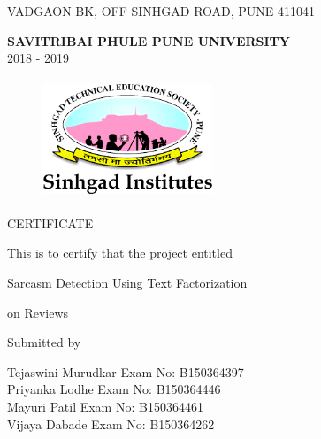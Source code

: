 \documentclass[oneside,a4paper,12pt]{book}
\begin{document}
\begin{center}
\fontsize{12}{12pt}\selectfont
VADGAON BK, OFF SINHGAD ROAD, PUNE 411041 \\[5mm]
\begin{center}
    \fontsize{12}{12pt}\selectfont
\textbf{SAVITRIBAI PHULE PUNE UNIVERSITY}\\ 2018 - 2019\\ 
\end{center}

\end{center}

\newpage
\setcounter{page}{0}
\frontmatter
{}
\rfoot{\thepage}

\begin{figure}[ht]
\centering
\includegraphics[height=1.4in, width=2.0in,keepaspectratio]{logo.png}\\[8mm]
\end{figure}


{\bfseries \fontsize{16}{12} \selectfont \centerline{CERTIFICATE} 
\vspace*{2\baselineskip}} 

\centerline{This is to certify that the project entitled}
\vspace*{.5\baselineskip} 


{\bfseries \fontsize{14}{12} \selectfont \centerline{Sarcasm Detection Using Text Factorization}
\centerline{on Reviews}  
\vspace*{0.5\baselineskip}}

\centerline{Submitted by}
\vspace*{0.5\baselineskip} 

\begin{flushleft}
\hspace{25 mm}Tejaswini Murudkar \hspace{25 mm} Exam No: B150364397  \\
\hspace{25 mm}Priyanka Lodhe \hspace{33 mm} Exam No: B150364446  \\
\hspace{25 mm}Mayuri Patil \hspace{38.5 mm} Exam No: B150364461  \\
\hspace{25 mm}Vijaya Dabade \hspace{35 mm} Exam No: B150364262  \\
\end{flushleft}
\vspace*{0.5\baselineskip}
\end{document}
